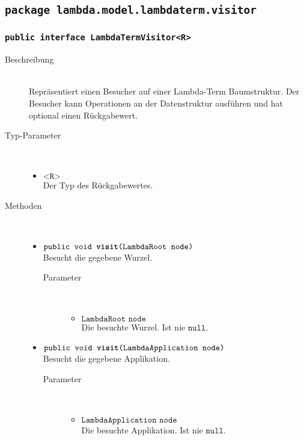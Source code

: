 \subsection{\texttt{package lambda.model.lambdaterm.visitor}}

\subsubsection{\normalfont \texttt{public interface \textbf{LambdaTermVisitor<R>}}}

\begin{description}
\item[Beschreibung] \hfill \\ Repräsentiert einen Besucher auf einer Lambda-Term Baumstruktur. Der Besucher kann Operationen an der Datenstruktur ausführen und hat optional einen Rückgabewert.

\item[Typ-Parameter] \hfill \\
	\vspace{-.8cm}
	\begin{itemize}
		\item $\texttt{<R>}$ \\ Der Typ des Rückgabewertes.
	\end{itemize}

\item[Methoden] \hfill \\
	\vspace{-.8cm}
	\begin{itemize}
		\item $\texttt{public void \textbf{visit}(LambdaRoot node)}$ \\ Besucht die gegebene Wurzel.
		\begin{description}
			\item[Parameter] \hfill \\
			\vspace{-.8cm}
			\begin{itemize}
				\item $\texttt{LambdaRoot node}$ \\ Die besuchte Wurzel. Ist nie $\texttt{null}$.
			\end{itemize}
		\end{description}
			
		\item $\texttt{public void \textbf{visit}(LambdaApplication node)}$ \\ Besucht die gegebene Applikation.
		\begin{description}
			\item[Parameter] \hfill \\
			\vspace{-.8cm}
			\begin{itemize}
				\item $\texttt{LambdaApplication node}$ \\ Die besuchte Applikation. Ist nie $\texttt{null}$.
			\end{itemize}
		\end{description}
		

\end{itemize}
\end{description}
